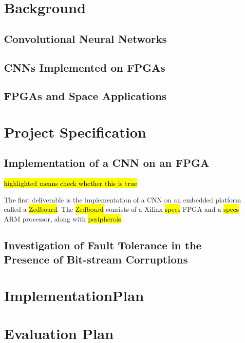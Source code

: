\documentclass[11pt]{article}
\begin{document}
\section{Background}
\label{sec:Background}

\subsection{Convolutional Neural Networks}
\label{sec:ConvolutionalNeuralNetworks}

\subsection{CNNs Implemented on FPGAs}
\label{sec:CNNsImplementedOnFPGAs}

\subsection{FPGAs and Space Applications}
\label{sec:FPGAsAndSpaceApplications}

\section{Project Specification}
\label{sec:ProjectSpecification}

\subsection{Implementation of a CNN on an FPGA}
\label{sec:ImplementationOfACNNOnAnFPGA}

\hl{highlighted means check whether this is true}

The first deliverable is the implementation of a CNN on an embedded platform called a \hl{Zedboard}. The \hl{Zedboard} consists of a Xilinx \hl{specs} FPGA and a \hl{specs} ARM processor, along with \hl{peripherals}.

\subsection{Investigation of Fault Tolerance in the Presence of Bit-stream Corruptions}
\label{sec:InvestigationOfFaultToleranceInThePresenceOfBitstreamCorruptions}

\section{ImplementationPlan}
\label{sec:ImplementationPlan}

\section{Evaluation Plan}
\label{sec:EvaluationPlan}






\nocite{*}
\end{document}
